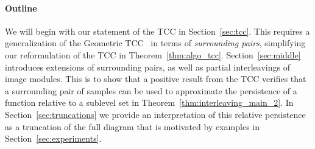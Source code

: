 %
%
%

\paragraph*{Outline}

We will begin with our statement of the TCC in Section~\ref{sec:tcc}.
This requires a generalization of the Geometric TCC~\cite{cavanna2017when} in terms of \emph{surrounding pairs}, simplifying our reformulation of the TCC in Theorem~\ref{thm:algo_tcc}.
Section~\ref{sec:middle} introduces extensions of surrounding pairs, as well as partial interleavings of image modules.
This is to show that a positive result from the TCC verifies that a surrounding pair of samples can be used to approximate the persistence of a function relative to a sublevel set in Theorem~\ref{thm:interleaving_main_2}.
In Section~\ref{sec:truncations} we provide an interpretation of this relative persistence as a truncation of the full diagram that is motivated by examples in Section~\ref{sec:experiments}.
